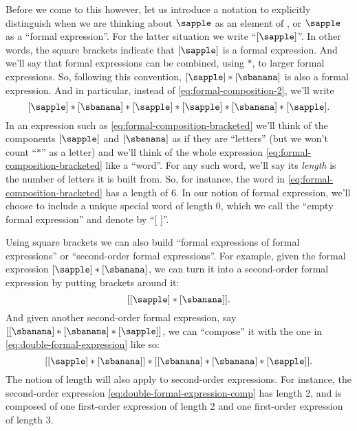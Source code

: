 Before we come to this however, let us introduce a notation to explicitly distinguish when we are thinking about $\sapple$ as an element of \Obja, or $\sapple$ as a ``formal expression''.
For the latter situation we write ``$[\sapple]$''.
In other words, the square brackets indicate that $[\sapple]$ is a formal expression.
And we'll say that formal expressions can be combined, using $*$, to larger formal expressions.
So, following this convention, $[\sapple] * [\sbanana]$ is also a formal expression.
And in particular, instead of \cref{eq:formal-composition-2}, we'll write
\begin{equation}
    \label{eq:formal-composition-bracketed}
    [\sapple] * [\sbanana] * [\sapple] * [\sapple] * [\sbanana] * [\sapple].
\end{equation}
%
In an expression such as \cref{eq:formal-composition-bracketed} we'll think of the components $[\sapple]$ and $[\sbanana]$ as if they are ``letters'' (but we won't count ``$*$'' as a letter) and we'll think of the whole expression \cref{eq:formal-composition-bracketed} like a ``word''.
For any such word, we'll say its \emph{length} is the number of letters it is built from.
So, for instance, the word in \cref{eq:formal-composition-bracketed} has a length of $6$.
In our notion of formal expression, we'll choose to include a unique special word of length $0$, which we call the ``empty formal expression'' and denote by ``[ ]''.

Using square brackets we can also build ``formal expressions of formal expressions'' or ``second-order formal expressions''.
For example, given the formal expression $[\sapple] * [\sbanana]$, we can turn it into a second-order formal expression by putting brackets around it:
\begin{equation}
    \label{eq:double-formal-expression}
    [[\sapple] * [\sbanana]].
\end{equation}
And given another second-order formal expression, say $[[\sbanana] * [\sbanana] * [\sapple]]$, we can ``compose'' it with the one in \cref{eq:double-formal-expression} like so:
\begin{equation}
    \label{eq:double-formal-expression-comp}
    [[\sapple] * [\sbanana]] * [[\sbanana] * [\sbanana] * [\sapple]].
\end{equation}
The notion of length will also apply to second-order expressions.
For instance, the second-order expression \cref{eq:double-formal-expression-comp} has length 2, and is composed of one first-order expression of length 2 and one first-order expression of length 3.

